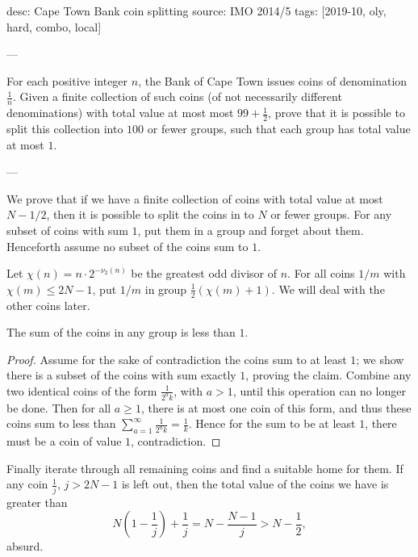desc: Cape Town Bank coin splitting
source: IMO 2014/5
tags: [2019-10, oly, hard, combo, local]

---

For each positive integer $n$, the Bank of Cape Town issues coins of denomination $\frac1n$. Given a finite collection of such coins (of not necessarily different denominations) with total value at most most $99+\frac12$, prove that it is possible to split this collection into $100$ or fewer groups, such that each group has total value at most $1$.

---

We prove that if we have a finite collection of coins with total value at most $N-1/2$, then it is possible to split the coins in to $N$ or fewer groups. For any subset of coins with sum $1$, put them in a group and forget about them. Henceforth assume no subset of the coins sum to $1$.

Let $\chi(n)=n\cdot 2^{-\nu_2(n)}$ be the greatest odd divisor of $n$. For all coins $1/m$ with $\chi(m)\le 2N-1$, put $1/m$ in group $\tfrac12(\chi(m)+1)$. We will deal with the other coins later.
\begin{iclaim*}
    The sum of the coins in any group is less than $1$.
\end{iclaim*}
\begin{proof}
    Assume for the sake of contradiction the coins sum to at least $1$; we show there is a subset of the coins with sum exactly $1$, proving the claim. Combine any two identical coins of the form $\tfrac1{2^ak}$, with $a>1$, until this operation can no longer be done. Then for all $a\ge 1$, there is at most one coin of this form, and thus these coins sum to less than $\sum_{a=1}^\infty\frac1{2^ak}=\frac1k$. Hence for the sum to be at least $1$, there must be a coin of value $1$, contradiction.
\end{proof}

Finally iterate through all remaining coins and find a suitable home for them. If any coin $\tfrac1j$, $j>2N-1$ is left out, then the total value of the coins we have is greater than \[N\left(1-\frac1j\right)+\frac1j=N-\frac{N-1}j>N-\frac12,\]
absurd.
